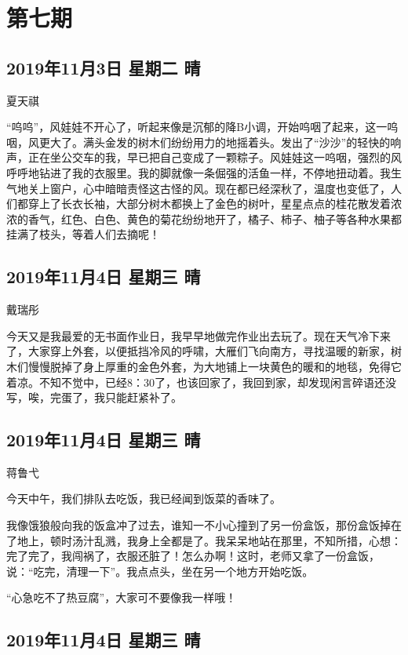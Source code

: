 \chapter{第七期}

\section{2019年11月3日 星期二 晴}

夏天祺

``呜呜''，风娃娃不开心了，听起来像是沉郁的降B小调，开始呜咽了起来，这一呜咽，风更大了。满头金发的树木们纷纷用力的地摇着头。发出了``沙沙''的轻快的响声，正在坐公交车的我，早已把自己变成了一颗粽子。风娃娃这一呜咽，强烈的风呼呼地钻进了我的衣服里。我的脚就像一条倔强的活鱼一样，不停地扭动着。我生气地关上窗户，心中暗暗责怪这古怪的风。现在都已经深秋了，温度也变低了，人们都穿上了长衣长袖，大部分树木都换上了金色的树叶，星星点点的桂花散发着浓浓的香气，红色、白色、黄色的菊花纷纷地开了，橘子、柿子、柚子等各种水果都挂满了枝头，等着人们去摘呢！

\section{2019年11月4日 星期三 晴}

戴瑞彤

今天又是我最爱的无书面作业日，我早早地做完作业出去玩了。现在天气冷下来了，大家穿上外套，以便抵挡冷风的呼啸，大雁们飞向南方，寻找温暖的新家，树木们慢慢脱掉了身上厚重的金色外套，为大地铺上一块黄色的暖和的地毯，免得它着凉。不知不觉中，已经8：30了，也该回家了，我回到家，却发现闲言碎语还没写，唉，完蛋了，我只能赶紧补了。

\section{2019年11月4日 星期三 晴}

蒋鲁弋

今天中午，我们排队去吃饭，我已经闻到饭菜的香味了。

我像饿狼般向我的饭盒冲了过去，谁知一不小心撞到了另一份盒饭，那份盒饭掉在了地上，顿时汤汁乱溅，我身上全都是了。我呆呆地站在那里，不知所措，心想：完了完了，我闯祸了，衣服还脏了！怎么办啊！这时，老师又拿了一份盒饭，说：``吃完，清理一下''。我点点头，坐在另一个地方开始吃饭。

``心急吃不了热豆腐''，大家可不要像我一样哦！

\section{2019年11月4日 星期三 晴}

